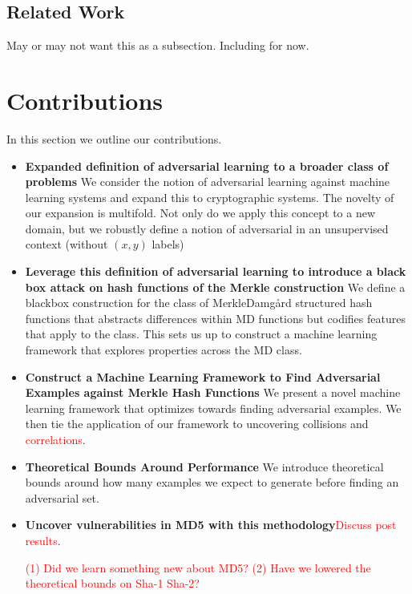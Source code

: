 \documentclass[letterpaper,twocolumn,10pt]{article}
\begin{document}
\subsection{Related Work}
May or may not want this as a subsection. Including for now. 


\section{Contributions}
In this section we outline our contributions. 

\begin{itemize}
\item \textbf{Expanded definition of adversarial learning to a broader class of problems} We consider the notion of adversarial learning against machine learning systems and expand this to cryptographic systems. The novelty of our expansion is multifold. Not only do we apply this concept to a new domain, but we robustly define a notion of adversarial in an unsupervised context (without $(x,y)$ labels) 
\item \textbf{Leverage this definition of adversarial learning to introduce a black box attack on hash functions of the Merkle construction} We define a blackbox construction for the class of Merkle{\textendash}Damg\r{a}rd structured hash functions that abstracts differences within MD functions but codifies features that apply to the class. This sets us up to construct a machine learning framework that explores properties across the MD class. 
\item \textbf{Construct a Machine Learning Framework to Find Adversarial Examples against Merkle Hash Functions} We present a novel machine learning framework that optimizes towards finding adversarial examples. We then tie the application of our framework to uncovering collisions and \textcolor{red}{correlations}. 
\item \textbf{Theoretical Bounds Around Performance} We introduce theoretical bounds around how many examples we expect to generate before finding an adversarial set.
\item \textbf{Uncover vulnerabilities in MD5 with this methodology}\textcolor{red}{Discuss post results}.

\textcolor{red}{(1) Did we learn something new about MD5? (2) Have we lowered the theoretical bounds on Sha-1 Sha-2?}
\end{itemize}
\end{document}
